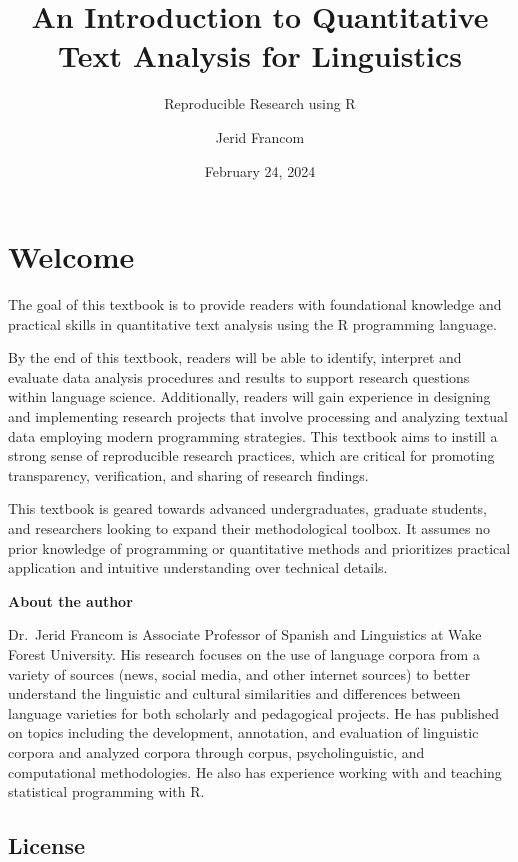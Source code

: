 \documentclass[
  letterpaper,
  DIV=11,
  numbers=noendperiod]{scrreprt}
\title{An Introduction to Quantitative Text Analysis for Linguistics}
\subtitle{Reproducible Research using R}
\author{Jerid Francom}
\date{February 24, 2024}
\renewcommand*\contentsname{Table of contents}
\newcommand\contentsname{Table of contents}
\theoremstyle{definition}
\theoremstyle{remark}
\begin{document}
\maketitle

\renewcommand*\contentsname{Table of contents}
{
\setcounter{tocdepth}{2}
\tableofcontents
}

\chapter*{Welcome}\label{welcome}


The goal of this textbook is to provide readers with foundational
knowledge and practical skills in quantitative text analysis using the R
programming language.

By the end of this textbook, readers will be able to identify, interpret
and evaluate data analysis procedures and results to support research
questions within language science. Additionally, readers will gain
experience in designing and implementing research projects that involve
processing and analyzing textual data employing modern programming
strategies. This textbook aims to instill a strong sense of reproducible
research practices, which are critical for promoting transparency,
verification, and sharing of research findings.

This textbook is geared towards advanced undergraduates, graduate
students, and researchers looking to expand their methodological
toolbox. It assumes no prior knowledge of programming or quantitative
methods and prioritizes practical application and intuitive
understanding over technical details.

\textbf{About the author}

Dr.~Jerid Francom is Associate Professor of Spanish and Linguistics at
Wake Forest University. His research focuses on the use of language
corpora from a variety of sources (news, social media, and other
internet sources) to better understand the linguistic and cultural
similarities and differences between language varieties for both
scholarly and pedagogical projects. He has published on topics including
the development, annotation, and evaluation of linguistic corpora and
analyzed corpora through corpus, psycholinguistic, and computational
methodologies. He also has experience working with and teaching
statistical programming with R.

\section*{License}\label{license}
\end{document}

